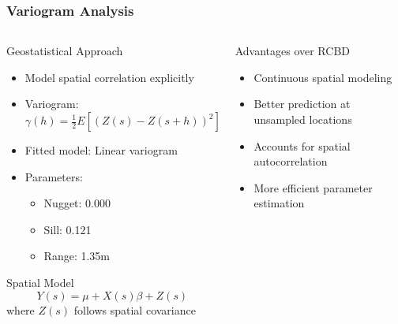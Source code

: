 \begin{frame}
    \frametitle{Variogram Analysis}
    
    \begin{columns}[T]
        \begin{column}{0.5\textwidth}
            \begin{block}{Geostatistical Approach}
                \begin{itemize}
                    \item Model spatial correlation explicitly
                    \item Variogram: $\gamma(h) = \frac{1}{2}E[(Z(s) - Z(s+h))^2]$
                    \item Fitted model: Linear variogram
                    \item Parameters:
                    \begin{itemize}
                        \scriptsize
                        \item Nugget: 0.000
                        \item Sill: 0.121
                        \item Range: 1.35m
                    \end{itemize}
                \end{itemize}
            \end{block}
            
            \begin{block}{Spatial Model}
                $$Y(s) = \mu + X(s)\beta + Z(s)$$
                where $Z(s)$ follows spatial covariance
            \end{block}
        \end{column}
        
        \begin{column}{0.5\textwidth}
            \begin{block}{Advantages over RCBD}
                \begin{itemize}
                    \item Continuous spatial modeling
                    \item Better prediction at unsampled locations
                    \item Accounts for spatial autocorrelation
                    \item More efficient parameter estimation
                \end{itemize}
            \end{block}
            

\end{column}
\end{columns}
\end{frame}

